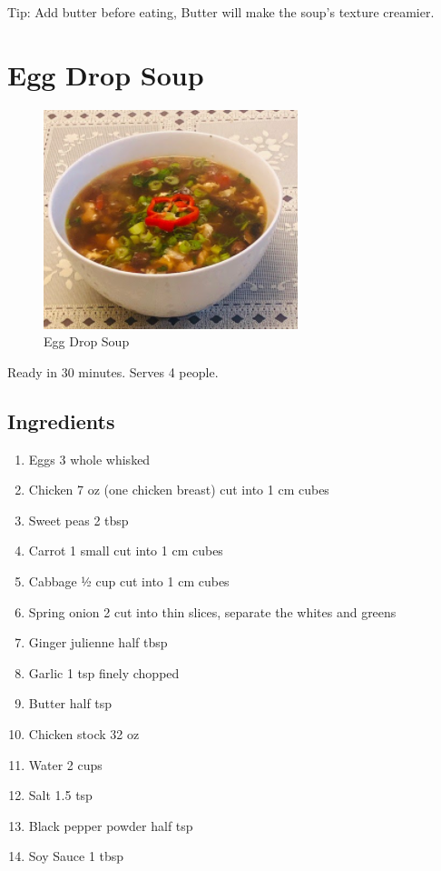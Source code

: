 \documentclass[
  oneside]{book}
\begin{document}
Tip:
Add butter before eating, Butter will make the soup's texture creamier.

\hypertarget{egg-drop-soup}{%
\section{Egg Drop Soup}\label{egg-drop-soup}}

\begin{figure}
\centering
\includegraphics{pictures/egg-drop-soup.png}
\caption{Egg Drop Soup}
\end{figure}

Ready in 30 minutes. Serves 4 people.

\hypertarget{ingredients-3}{%
\subsection{Ingredients}\label{ingredients-3}}

\begin{enumerate}
\def\labelenumi{\arabic{enumi}.}
\item
  Eggs 3 whole whisked
\item
  Chicken 7 oz (one chicken breast) cut into 1 cm cubes
\item
  Sweet peas 2 tbsp
\item
  Carrot 1 small cut into 1 cm cubes
\item
  Cabbage ½ cup cut into 1 cm cubes
\item
  Spring onion 2 cut into thin slices, separate the whites and greens
\item
  Ginger julienne half tbsp
\item
  Garlic 1 tsp finely chopped
\item
  Butter half tsp
\item
  Chicken stock 32 oz
\item
  Water 2 cups
\item
  Salt 1.5 tsp
\item
  Black pepper powder half tsp
\item
  Soy Sauce 1 tbsp
\end{enumerate}
\end{document}
